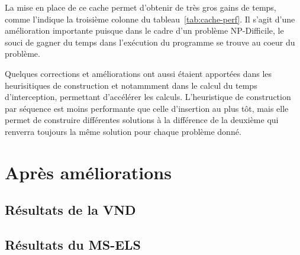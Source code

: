     	La mise en place de ce cache permet d'obtenir de très gros gains de temps, comme l'indique la troisième colonne du tableau~\ref{tab:cache-perf}. Il s'agit d'une amélioration importante puisque dans le cadre d'un problème NP-Difficile, le souci de gagner du temps dans l'exécution du programme se trouve au coeur du problème.
    	
    	Quelques corrections et améliorations ont aussi étaient apportées dans les heurisitiques de construction et notammment dans le calcul du temps d'interception, permettant d'accélérer les calculs. L'heuristique de construction par séquence est moins performante que celle d'insertion au plus tôt, mais elle permet de construire différentes solutions à la différence de la deuxième qui renverra toujours la même solution pour chaque problème donné.
    	
    \section{Après améliorations}
    	\subsection{Résultats de la VND}
    	\subsection{Résultats du MS-ELS}

